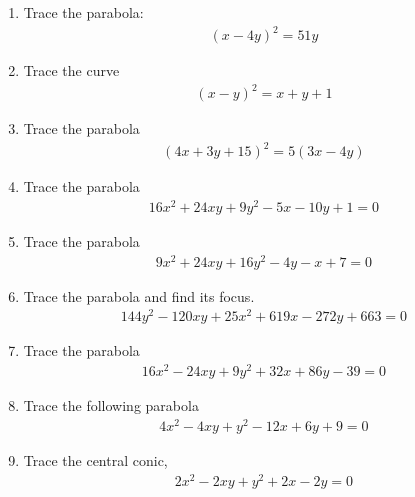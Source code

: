 \renewcommand{\theequation}{\theenumi}
\renewcommand{\thefigure}{\theenumi}
\begin{enumerate}[label=\thesubsection.\arabic*.,ref=\thesubsection.\theenumi]
%
\item Trace the parabola:
\begin{align}
	(x-4y)^2=51y
\end{align}
%
\solution


%
\item 	Trace the curve 
	\begin{align}
	\left(x-y\right)^2 = x+y+1
	\label{eq:solutions/41/2/eq0}
	\end{align}
%
\solution

%
\item Trace the parabola
\begin{align}
    (4x+3y+15)^2=5(3x-4y)
\end{align}
%
\solution

%
\item Trace the parabola
\begin{align}\nonumber
    16x^2+24xy+9y^2-5x-10y+1 = 0
\end{align}
%
\solution

%
\item Trace the parabola
\begin{align}
  9x^2+24xy+16y^2-4y-x+7=0 \label{eq:solutions/41/6/eq:prob}
\end{align}
%
\solution

%
\item Trace the parabola and find its focus.
\begin{align}
144y^2-120xy+25x^2+619x-272y+663=0
\end{align}
%
%
\solution

\item Trace the parabola
\begin{align}
   16x^2-24xy+9y^2+32x+86y-39=0 \label{eq:solutions/41/8/eq:given}
\end{align}
%
\solution

\item Trace the following parabola
\begin{align}
    4x^2-4xy+y^2-12x+6y+9=0
\end{align}
%
%
\solution

%
\item Trace the central conic,
\begin{align}
2x^2 - 2xy + y^2 + 2x - 2y = 0\label{eq:solutions/41/17/eq:1}

\end{align}
\end{enumerate}
